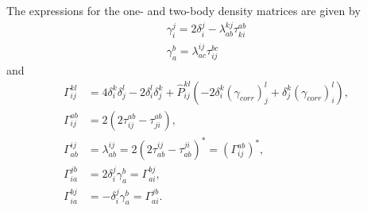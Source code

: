 \documentclass[10pt,a4paper]{article}
\begin{document}
The expressions for the one- and two-body density matrices are given by 
\begin{align}
\gamma_i^j = 2\delta^j_i - \lambda^{kj}_{ab}\tau^{ab}_{ki} \\
\gamma^b_a = \lambda^{ij}_{ac} \tau^{bc}_{ij}
\end{align}
and 
\begin{align}
\Gamma^{kl}_{ij} &= 4\delta^k_i\delta^l_j - 2 \delta^l_i\delta^k_j + \hat{P}^{kl}_{ij} \left(-2\delta^k_i(\gamma_{corr})^l_j + \delta^k_j(\gamma_{corr})^l_i \right), \\
\Gamma^{ab}_{ij} &= 2(2\tau^{ab}_{ij}-\tau^{ab}_{ji}), \\
\Gamma^{ij}_{ab} &= \lambda^{ij}_{ab} = 2(2\tau^{ij}_{ab}-\tau^{ji}_{ab})^* = (\Gamma^{ab}_{ij})^*, \\
\Gamma^{jb}_{ia} &= 2\delta^j_i\gamma^b_a = \Gamma^{bj}_{ai}, \\
\Gamma^{bj}_{ia} &= -\delta^j_i \gamma^b_a = \Gamma^{jb}_{ai}.
\end{align}
\end{document}
